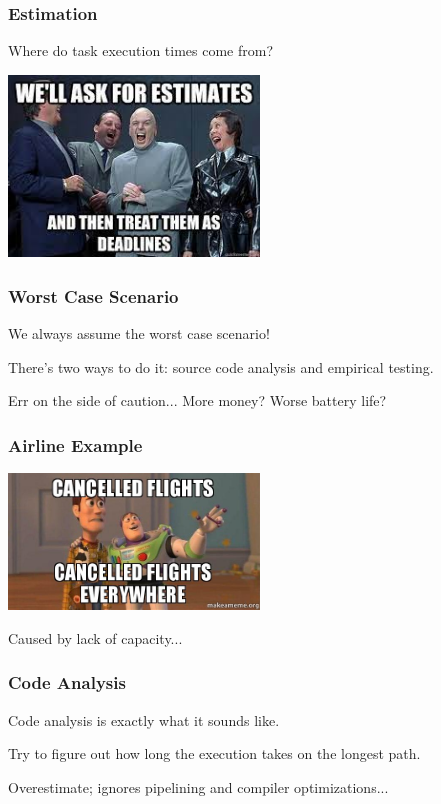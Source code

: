 \begin{frame}
\frametitle{Estimation}

Where do task execution times come from?

\begin{center}
	\includegraphics[width=0.5\textwidth]{images/estimates.jpg}
\end{center}

\end{frame}

\begin{frame}
\frametitle{Worst Case Scenario}

We always assume the worst case scenario! 

There's two ways to do it: source code analysis and empirical testing.

Err on the side of caution... More money? Worse battery life?

\end{frame}

\begin{frame}
\frametitle{Airline Example}

\begin{center}
	\includegraphics[width=0.5\textwidth]{images/cancelled-flights.jpg}
\end{center}

Caused by lack of capacity...

\end{frame}

\begin{frame}
\frametitle{Code Analysis}

Code analysis is exactly what it sounds like.

Try to figure out how long the execution takes on the longest path.

Overestimate; ignores pipelining and compiler optimizations...

\end{frame}

